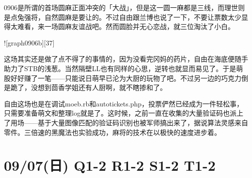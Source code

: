 
0906是所谓的首场圆麻正面冲突的「大战」，但是这一圆一麻都是三线，而理世则是点兔强将，自然圆麻是要让的。不过自由跟兰博也说了一下，不要让票数太少显得太难看，来一场圆麻友谊战吧。然而圆脸并无心恋战，就三位淘汰了小白。

![graph0906b][37]

这场其实还是做了点不得了的事情的，因为没看完冈妈的药片，自由在海底便随手助力了STB的浅葱。当然隔壁LL也有同样的心思，逆转也就显而易见了。于是萌股好好赚了一笔——只能说日萌早已沦为大厨的玩物了吧。不过另一边的巧克力倒是跪了，没想到茴香学姐还有人厨啊，就不瞎掺和了。

自由这场也是在调试moeb.rb和autotickets.php，投票俨然已经成为一件轻松事，只需要准备萌文和整理log就是了。这时候，之前一直在收集的大量验证码也派上了用场——基于大量图像匹配的验证码识别也被军师搞出来了，据说算法灵感来自零件。三倍速的黑魔法也实验成功，麻将的技术在以极快的速度进步着。

\section{09/07(日) Q1-2 R1-2 S1-2 T1-2}


